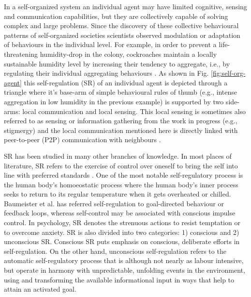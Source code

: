 In a self-organized system an individual agent may have limited cognitive, sensing and communication capabilities, but they are collectively capable of solving complex and large problems.  Since the discovery of these collective behavioural patterns of self-organized  societies scientists observed modulation or adaptation of behaviours in the individual level. For example, in order to prevent a life-threatening humidity-drop in the colony, cockroaches maintain a locally sustainable humidity level by increasing their tendency to aggregate, i.e., by regulating their individual aggregating behaviours \cite{Garnier+2007}. As shown in Fig. \ref{fig:self-org-agent} this  self-regulation (SR) of an individual agent is depicted through a triangle where it's base-arm of simple behavioural rules of thumb (e.g., intense aggregation in low humidity in the previous example) is supported by two side-arms: local communication and local sensing. This local sensing is sometimes also referred to as sensing or information gathering from the work in progress (e.g., stigmergy) and the local communication mentioned here is directly linked with peer-to-peer (P2P) communication with neighbours  \cite{Camazine+2001}.

SR has been studied in many other branches of knowledge. In most places of literature, SR refers to the exercise of control over oneself to bring the self into line with preferred standards \cite{Baumeister+2007}. One of the most notable self-regulatory process is the human body's homoeostatic process where the human body's inner process seeks to return to its regular temperature when it gets overheated or chilled. Baumeister et al. has referred self-regulation to goal-directed behaviour or feedback loops, whereas self-control may be associated with conscious impulse control.  In psychology, SR denotes the strenuous actions to resist temptation or to overcome anxiety. SR is also divided into two categories: 1) conscious and 2) unconscious SR. Conscious SR puts emphasis on conscious, deliberate efforts in self-regulation. On the other hand, unconscious self-regulation refers to the automatic self-regulatory process that is although not nearly as labour intensive, but operate in harmony with unpredictable, unfolding events in the environment, using and transforming the available informational input in ways that help to attain an activated goal.

